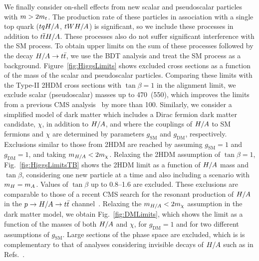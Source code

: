 We finally consider on-shell effects from new scalar and pseudoscalar
particles with $m > 2m_t$. The production rate of these
particles in association with a single top quark ($tqH/A$,
$tWH/A$) is significant, so we include these processes in
addition to $t\overline{t}H/A$. These processes 
also do not suffer significant
interference with the SM \tttt process. To obtain upper limits on the sum of
these processes followed by the decay $H/A\to t\bar{t}$, we use the BDT
analysis and treat the SM \tttt process as a background.
Figure~\ref{fig:HiggsLimits} shows excluded cross sections as a function
of the mass of the scalar and pseudoscalar particles. Comparing these
limits with the Type-II 2HDM cross sections with $\tan\beta = 1$ in the
alignment limit, we exclude scalar (pseudoscalar) masses up to 470~(550)\GeV,
which improves the limits from a previous CMS analysis~\cite{CMS:mySUS2016}
by more than 100\GeV.
Similarly, we consider a simplified model
of dark matter which includes a Dirac
fermion dark matter candidate, $\chi$, in addition to $H/A$, and where
the couplings of $H/A$ to SM fermions and $\chi$ are determined by
parameters $g_\mathrm{SM}$ and $g_\mathrm{DM}$, respectively. 
Exclusions similar to those from 2HDM are reached by assuming $g_\mathrm{SM}
= 1$ and $g_\mathrm{DM} = 1$, and taking $m_{H/A} < 2 m_\chi$. 
Relaxing
the 2HDM assumption of $\tan\beta = 1$, Fig.~\ref{fig:HiggsLimitsTB} shows
the 2HDM limit as a function of $H/A$ mass and $\tan\beta$, considering
one new particle at a time and also including a scenario with $m_H =
m_A$. Values of $\tan\beta$ up to 0.8--1.6 are
excluded. These exclusions are comparable
to those of a recent CMS search for the resonant production of $H/A$ in
the $p\to H/A \to t\bar{t}$ channel~\cite{CMS:HIG17027}. Relaxing the
$m_{H/A} < 2 m_\chi$ assumption in the dark matter model,
we obtain
Fig.~\ref{fig:DMLimits}, which shows the limit 
as a function of the
masses of both $H/A$ and $\chi$, for $g_\mathrm{DM} = 1$ and for two
different assumptions of $g_\mathrm{SM}$. Large sections of the phase space
are excluded, which is
is complementary to that of analyses considering invisible decays of $H/A$
 such as in Refs.~\cite{CMS:DMsingletop, ATLAS:Aaboud2017rzf}.

